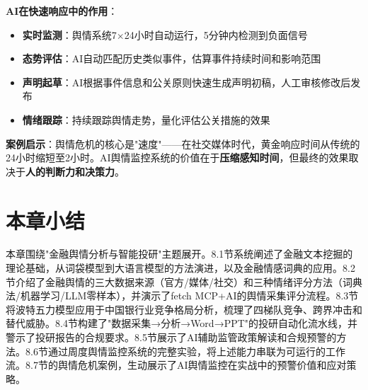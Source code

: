 \begin{casebox}
\textbf{AI在快速响应中的作用}：

\begin{itemize}[leftmargin=2em]
  \item \textbf{实时监测}：舆情系统7$\times$24小时自动运行，5分钟内检测到负面信号
  \item \textbf{态势评估}：AI自动匹配历史类似事件，估算事件持续时间和影响范围
  \item \textbf{声明起草}：AI根据事件信息和公关原则快速生成声明初稿，人工审核修改后发布
  \item \textbf{情绪跟踪}：持续跟踪舆情走势，量化评估公关措施的效果
\end{itemize}

\textbf{案例启示}：舆情危机的核心是"速度"——在社交媒体时代，黄金响应时间从传统的24小时缩短至2小时。AI舆情监控系统的价值在于\textbf{压缩感知时间}，但最终的效果取决于\textbf{人的判断力和决策力}。
\end{casebox}

\section*{本章小结}


本章围绕"金融舆情分析与智能投研"主题展开。8.1节系统阐述了金融文本挖掘的理论基础，从词袋模型到大语言模型的方法演进，以及金融情感词典的应用。8.2节介绍了金融舆情的三大数据来源（官方/媒体/社交）和三种情绪评分方法（词典法/机器学习/LLM零样本），并演示了fetch MCP+AI的舆情采集评分流程。8.3节将波特五力模型应用于中国银行业竞争格局分析，梳理了四梯队竞争、跨界冲击和替代威胁。8.4节构建了"数据采集→分析→Word→PPT"的投研自动化流水线，并警示了投研报告的合规要求。8.5节展示了AI辅助监管政策解读和合规预警的方法。8.6节通过周度舆情监控系统的完整实验，将上述能力串联为可运行的工作流。8.7节的舆情危机案例，生动展示了AI舆情监控在实战中的预警价值和应对策略。


